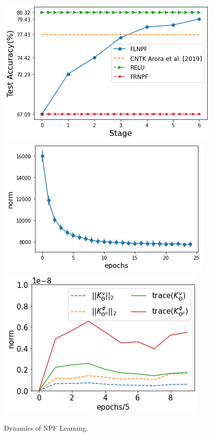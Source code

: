 \begin{figure}
\centering
\includegraphics[scale=0.23]{figs/gap.png}
\includegraphics[scale=0.23]{figs/path-gram.png}
\includegraphics[scale=0.23]{figs/kvkphi.png}
\caption{Dynamics of NPF Learning. }
\label{fig:dynamics}
\end{figure}
